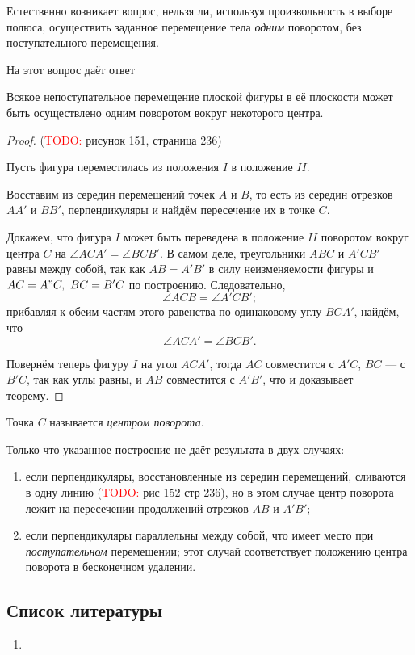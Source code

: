 Естественно возникает вопрос, нельзя ли, используя произвольность в выборе
полюса, осуществить заданное перемещение тела \textit{одним} поворотом, без
поступательного перемещения.

На этот вопрос даёт ответ
\begin{theorem}[Эйлера]
  \label{theorem:euler}
  Всякое непоступательное перемещение плоской фигуры в её плоскости может быть
  осуществлено одним поворотом вокруг некоторого центра.
\end{theorem}

\begin{proof}
  (\textcolor{red}{TODO:} рисунок 151, страница 236)

  Пусть фигура переместилась из положения $I$ в положение $II$.

  Восставим из середин перемещений точек $A$ и $B$, то есть из середин отрезков
  $AA'$ и $BB'$, перпендикуляры и найдём пересечение их в точке $C$.

  Докажем, что фигура $I$ может быть переведена в положение $II$ поворотом
  вокруг центра $C$ на $\angle ACA' = \angle BCB'$. В самом деле, треугольники
  $ABC$ и $A'CB'$ равны между собой, так как $AB = A'B'$ в силу неизменяемости
  фигуры и $AC = A"C,~BC = B'C$ по построению. Следовательно,
  \begin{equation*}
    \angle ACB = \angle A'CB';
  \end{equation*}
  прибавляя к обеим частям этого равенства по одинаковому углу $BCA'$, найдём,
  что
  \begin{equation*}
    \angle ACA' = \angle BCB'.
  \end{equation*}

  Повернём теперь фигуру $I$ на угол $ACA'$, тогда $AC$ совместится с $A'C$,
  $BC$ --- с $B'C$, так как углы равны, и $AB$ совместится с $A'B'$, что и
  доказывает теорему.
\end{proof}

\begin{definition}
  Точка $C$ называется \textit{центром поворота}.
\end{definition}

\begin{remark}
  Только что указанное построение не даёт результата в двух случаях:
  \begin{enumerate}
    \item если перпендикуляры, восстановленные из середин перемещений, сливаются
      в одну линию (\textcolor{red}{TODO:} рис 152 стр 236), но в этом случае
      центр поворота лежит на пересечении продолжений отрезков $AB$ и $A'B'$;

    \item если перпендикуляры параллельны между собой, что имеет место при
      \textit{поступательном} перемещении; этот случай соответствует положению
      центра поворота в бесконечном удалении.
  \end{enumerate}
\end{remark}

\subsection{Список литературы}
\begin{enumerate}
  \item \cite{lourie}
\end{enumerate}

